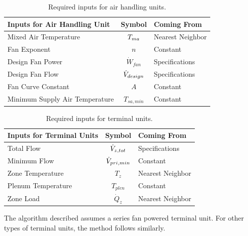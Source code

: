 \begin{table}
\centering
\caption{Required inputs for air handling units.}
\label{tab:RequiredInputsForAHUs}
\begin{tabular}{lcl}\toprule
    Inputs for Air Handling Unit   & Symbol            & Coming From      \\ \midrule
    Mixed Air Temperature          & \(T_{ma}{}\)        & Nearest Neighbor \\
    Fan Exponent                   & \(n\)             & Constant         \\
    Design Fan Power               & \(\dot{W}_{fan}\) & Specifications   \\
    Design Fan Flow                & \(\dot{V}_{design}\) & Specifications   \\
    Fan Curve Constant             & \(A\)             & Constant         \\
    Minimum Supply Air Temperature & \(T_{sa,min}\)    & Constant         \\ \bottomrule
\end{tabular}
\end{table}

\begin{table}
\centering
\caption{Required inputs for terminal units.}
\label{tab:RequiredInputsForTerminalUnits}
\begin{tabular}{lcl}\toprule
    Inputs for Terminal Units & Symbol             & Coming From      \\ \midrule
    Total Flow                & \(\dot{V}_{z,tot}\) & Specifications   \\
     Minimum Flow             & \(\dot{V}_{pri,min}\) & Constant         \\
     Zone Temperature         & \(T_{z}\)          & Nearest Neighbor \\
     Plenum Temperature       & \(T_{plen}\)       & Constant         \\
     Zone Load                & \(\dot{Q}_{z}\)    & Nearest Neighbor \\ \bottomrule
\end{tabular}
\end{table}


The algorithm described assumes a series fan powered terminal unit. For
other types of terminal units, the method follows similarly. 

